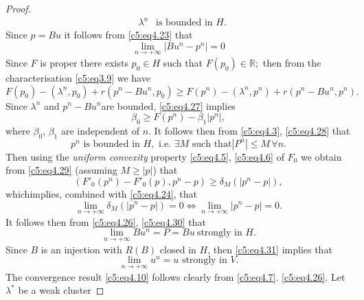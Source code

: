 \begin{proof}
\begin{align}
& \lambda^n  ~~\text{ is bounded in }H.\tag{4.25}\label{c5:eq4.25}
 \end{align}
 Since $ p = Bu$ it follows from \eqref{c5:eq4.23} that 
 \begin{equation}
\lim\limits_{n \to + \infty} | Bu^n - p^n | = 0 \tag{4.26}\label{c5:eq4.26}
  \end{equation}  
  Since $F$ is  proper there exists $p_0 \in H$ such that $F (p_0) \in \mathbb{R};$ then from the characterisation \eqref{c5:eq3.9} we have 
  \begin{equation}
F (p_0) - (\lambda^n, p_0) + r (p^n - Bu^n, p_0) \geq F (p^n) - (\lambda^n, p^n) + r (p^n - Bu^n, p^n).\tag{4.27}\label{c5:eq4.27}
  \end{equation}  
  Since $\lambda^n$ and $p^n - Bu^n$are bounded, \eqref{c5:eq4.27} implies
  \begin{equation}
\beta_0 \geq F (p^n) - \beta_1 | p^n |, \tag{4.28}\label{c5:eq4.28}
  \end{equation}
  where $\beta_0$, $\beta_1$ are independent of $n$. It follows then
  from \eqref{c5:eq4.3}, \eqref{c5:eq4.28} that  
  \begin{equation}
p^n \text{ is bounded in } H, \text{ i.e. } \exists M \text{ such that
} | P^n | \leq M\, \forall n. \tag{4.29}\label{c5:eq4.29} 
 \end{equation} 
 Then using the \textit{uniform convexity} property \eqref{c5:eq4.5},
 \eqref{c5:eq4.6} of $F_0$ we obtain from \eqref{c5:eq4.29} (assuming
 $M \geq | p |$) that  
 $$
 (F'_0 (p^n) - F'_0 (p), p^n - p)\geq \delta_M(|p^n - p|),
 $$ 
 which\pageoriginale  implies, combined with \eqref{c5:eq4.24}, that 
 \begin{equation}
\lim_{n \to + \infty} \delta_M (| p^n - p|) = 0 \Leftrightarrow \lim_{n \to + \infty} | p^n - p| = 0. \tag{4.30}\label{c5:eq4.30}
 \end{equation} 
 It follows then from \eqref{c5:eq4.26}, \eqref{c5:eq4.30} that
 \begin{equation}
\lim_{n \to + \infty} Bu^n = P = Bu ~\text{strongly in }
H.\tag{4.31}\label{c5:eq4.31} 
 \end{equation}
 Since $B$ is an injection with $R(B)$ closed in $H$, then
 \eqref{c5:eq4.31} implies that  
 \begin{equation}
\lim_{n \to + \infty} u^n = u \text{ strongly in }V. \tag{4.32}\label{c5:eq4.32}
  \end{equation}
The convergence result \eqref{c5:eq4.10} follows clearly from
\eqref{c5:eq4.7}. \eqref{c5:eq4.26}. Let $\lambda^*$ be a weak cluster

\end{proof}
